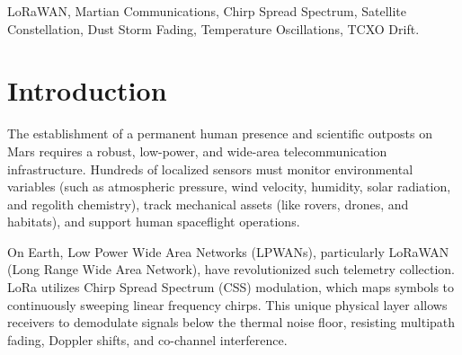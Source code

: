 \documentclass[journal,10pt,doublecolumn]{IEEEtran}
\begin{document}
\begin{IEEEkeywords}
LoRaWAN, Martian Communications, Chirp Spread Spectrum, Satellite Constellation, Dust Storm Fading, Temperature Oscillations, TCXO Drift.
\end{IEEEkeywords}

\section{Introduction}
\label{sec:intro}
The establishment of a permanent human presence and scientific outposts on Mars requires a robust, low-power, and wide-area telecommunication infrastructure. Hundreds of localized sensors must monitor environmental variables (such as atmospheric pressure, wind velocity, humidity, solar radiation, and regolith chemistry), track mechanical assets (like rovers, drones, and habitats), and support human spaceflight operations. 

On Earth, Low Power Wide Area Networks (LPWANs), particularly LoRaWAN (Long Range Wide Area Network), have revolutionized such telemetry collection. LoRa utilizes Chirp Spread Spectrum (CSS) modulation, which maps symbols to continuously sweeping linear frequency chirps. This unique physical layer allows receivers to demodulate signals below the thermal noise floor, resisting multipath fading, Doppler shifts, and co-channel interference.
\end{document}
